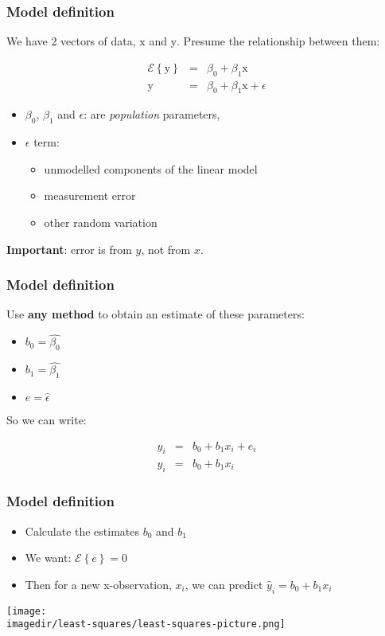 \begin{frame}\frametitle{Model definition}
	
	We have 2 vectors of data, $\mathrm{x}$ and $\mathrm{y}$. Presume the relationship between them:
	
	$$ 
	\begin{array}{rcl}
		\mathcal{E}\left\{\mathrm{y}\right\} &=& \beta_0 + \beta_1 \mathrm{x} \\
		\mathrm{y} &=& \beta_0 + \beta_1 \mathrm{x} + \epsilon 
	\end{array}
	$$
	\begin{itemize}
		\item	$\beta_0$, $\beta_1$ and $\epsilon$: are \emph{population} parameters, 
		\item	$\epsilon$ term: 
		\begin{itemize}
			\item	unmodelled components of the linear model 
			\item	measurement error 
			\item	other random variation 
		\end{itemize}
	\end{itemize}
	
	\textbf{Important}: error is from $y$, not from $x$.
\end{frame}

\begin{frame}\frametitle{Model definition}
	
	Use \textbf{any method} to obtain an estimate of these parameters: 
	\begin{itemize}
		\item	$b_0 = \hat{\beta_0}$ 
		\item	$b_1 = \hat{\beta_1}$ 
		\item	$e = \hat{\epsilon}$ 
	\end{itemize}
	
	So we can write:
	
	$$
	\begin{array}{rcl}
		y_i &=& b_0 + b_1 x_i + e_i \\
		\hat{y}_i &=& b_0 + b_1 x_i 
	\end{array}
	$$
\end{frame}

\begin{frame}\frametitle{Model definition}
	\begin{itemize}
		\item	Calculate the estimates $b_0$ and $b_1$ 
		\item	We want: $\mathcal{E}\left\{e\right\} = 0$ 
		\item	Then for a new x-observation, $x_i$, we can predict $\hat{y}_i =b_0 + b_1x_{i}$ 
	\end{itemize}
	\begin{center}
		\texttt{[image: \\imagedir/least-squares/least-squares-picture.png]}
	\end{center}
\end{frame}

